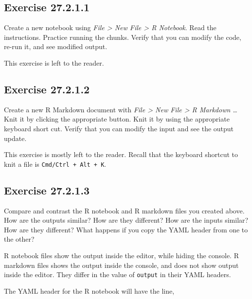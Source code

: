 \documentclass[]{book}
\theoremstyle{plain}
\theoremstyle{remark}
\begin{document}
\hypertarget{exercise-27.2.1.1}{%
\subsection*{\texorpdfstring{Exercise {27.2.1.1}}{Exercise 27.2.1.1}}\label{exercise-27.2.1.1}}

Create a new notebook using \emph{File \textgreater{} New File \textgreater{} R Notebook}. Read the instructions. Practice running the chunks. Verify that you can modify the code, re-run it, and see modified output.

This exercise is left to the reader.

\hypertarget{exercise-27.2.1.2}{%
\subsection*{\texorpdfstring{Exercise {27.2.1.2}}{Exercise 27.2.1.2}}\label{exercise-27.2.1.2}}

Create a new R Markdown document with \emph{File \textgreater{} New File \textgreater{} R Markdown \ldots{}} Knit it by clicking the appropriate button. Knit it by using the appropriate keyboard short cut. Verify that you can modify the input and see the output update.

This exercise is mostly left to the reader.
Recall that the keyboard shortcut to knit a file is \texttt{Cmd/Ctrl\ +\ Alt\ +\ K}.

\hypertarget{exercise-27.2.1.3}{%
\subsection*{\texorpdfstring{Exercise {27.2.1.3}}{Exercise 27.2.1.3}}\label{exercise-27.2.1.3}}

Compare and contrast the R notebook and R markdown files you created above. How are the outputs similar? How are they different? How are the inputs similar? How are they different? What happens if you copy the YAML header from one to the other?

R notebook files show the output inside the editor, while hiding the console. R markdown files shows the output inside the console, and does not show output inside the editor.
They differ in the value of \texttt{output} in their YAML headers.

The YAML header for the R notebook will have the line,
\end{document}
